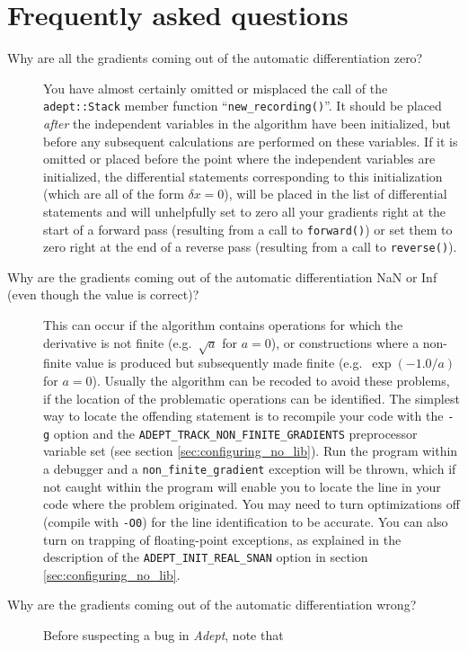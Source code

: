 \documentclass[a4,oneside]{book}
\def\codesize{\small}
\def\Adept{\emph{Adept}}
\def\code#1{{\codesize\texttt{#1}}}
\begin{document}
\section{Frequently asked questions}
\label{sec:faq}
\begin{description}
\item[Why are all the gradients coming out of the automatic
  differentiation zero?] You have almost certainly omitted or
  misplaced the call of the \code{adept::Stack} member function
  ``\code{new\_recording()}''. It should be placed \emph{after} the
  independent variables in the algorithm have been initialized, but
  before any subsequent calculations are performed on these
  variables. If it is omitted or placed before the point where the
  independent variables are initialized, the differential statements
  corresponding to this initialization (which are all of the form
  $\delta x=0$), will be placed in the list of differential statements
  and will unhelpfully set to zero all your gradients right at the
  start of a forward pass (resulting from a call to \code{forward()})
  or set them to zero right at the end of a reverse pass (resulting
  from a call to \code{reverse()}).
\item[Why are the gradients coming out of the automatic
  differentiation NaN or Inf (even though the value is correct)?] This
  can occur if the algorithm contains operations for which the
  derivative is not finite (e.g.\ $\sqrt{a}$ for $a=0$), or
  constructions where a non-finite value is produced but subsequently
  made finite (e.g.\ $\exp(-1.0/a)$ for $a=0$). Usually the algorithm
  can be recoded to avoid these problems, if the location of the
  problematic operations can be identified. The simplest way to locate
  the offending statement is to recompile your code with the \code{-g}
  option and the \code{ADEPT\_TRACK\_NON\_FINITE\_GRADIENTS}
  preprocessor variable set (see section
  \ref{sec:configuring_no_lib}). Run the program within a debugger and
  a \code{non\_finite\_gradient} exception will be thrown, which if
  not caught within the program will enable you to locate the line in
  your code where the problem originated.  You may need to turn
  optimizations off (compile with \code{-O0}) for the line
  identification to be accurate. You can also turn on trapping of
  floating-point exceptions, as explained in the description of the
  \code{ADEPT\_INIT\_REAL\_SNAN} option in section
  \ref{sec:configuring_no_lib}.
\item[Why are the gradients coming out of the automatic
  differentiation wrong?] Before suspecting a bug in \Adept, note that

\end{description}
\end{document}
